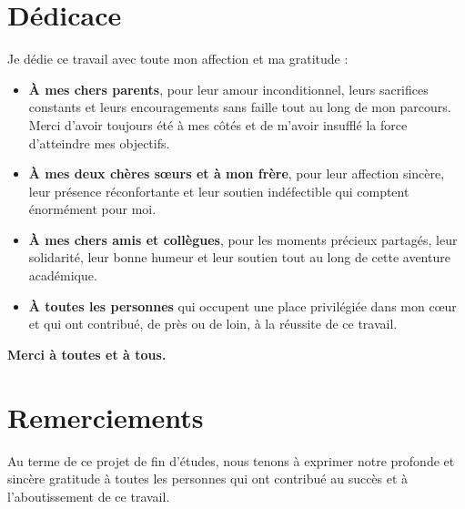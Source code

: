 \documentclass[12pt,a4paper,oneside]{report}
\begin{document}
\chapter*{Dédicace}

\begin{itshape}
Je dédie ce travail avec toute mon affection et ma gratitude :

\begin{itemize}[label=$\diamond$]
    \item \textbf{À mes chers parents}, pour leur amour inconditionnel, leurs sacrifices constants et leurs encouragements sans faille tout au long de mon parcours. Merci d'avoir toujours été à mes côtés et de m'avoir insufflé la force d'atteindre mes objectifs.
    \item \textbf{À mes deux chères sœurs et à mon frère}, pour leur affection sincère, leur présence réconfortante et leur soutien indéfectible qui comptent énormément pour moi.
    \item \textbf{À mes chers amis et collègues}, pour les moments précieux partagés, leur solidarité, leur bonne humeur et leur soutien tout au long de cette aventure académique.
    \item \textbf{À toutes les personnes} qui occupent une place privilégiée dans mon cœur et qui ont contribué, de près ou de loin, à la réussite de ce travail.
\end{itemize}
\end{itshape}

\vfill
\begin{flushright}
    \textbf{Merci à toutes et à tous.}
\end{flushright}

\clearpage

\chapter*{Remerciements}

Au terme de ce projet de fin d'études, nous tenons à exprimer notre profonde et sincère gratitude à toutes les personnes qui ont contribué au succès et à l'aboutissement de ce travail.
\end{document}
